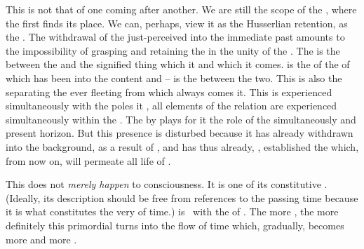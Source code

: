 This  is not that of one  coming after
another. We are still  the scope of the \hoa, where the first
 finds its place. We can, perhaps, view it as the Husserlian retention,
as the . The withdrawal of the
just-perceived into the immediate past amounts to the impossibility of
 grasping and retaining the  in the unity of the
.  The  is the  between the
 and the signified thing which it  and
 which it comes.   is the  of the  of
 which has been  into the  content
and  --  is the  between the two.
This is also the  separating the ever fleeting  from
 which always comes  it.  This  is
experienced simultaneously with the poles it , all elements of
the relation  are experienced simultaneously within the \hoa.  The
  by  plays for it the role of the
simultaneously and  present horizon.  But this  presence is
disturbed because it has already withdrawn into the background, as a result of
 , and has thus already, ,
established the  which, from now on, will permeate all life of
.

This does not {\em merely happen} to  consciousness. It
is one of its constitutive . (Ideally, its description should be
free from references to the passing time because it is what constitutes the very
 of time.)   is \equi\ with the
 of . The more  
, the more definitely this primordial  turns into the
flow of time which, gradually, becomes more and more .


